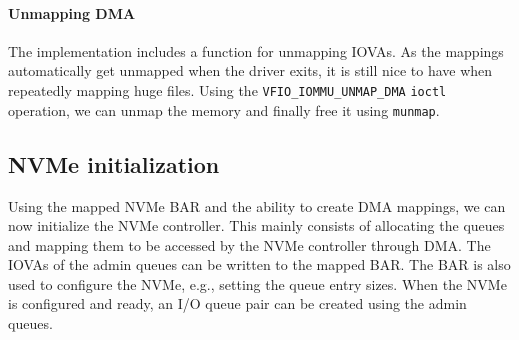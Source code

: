 \paragraph{Unmapping DMA}
The implementation includes a function for unmapping IOVAs. As the mappings automatically get unmapped when the driver exits, it is still nice to have when repeatedly mapping huge files. Using the \texttt{VFIO\_IOMMU\_UNMAP\_DMA} \texttt{ioctl} operation, we can unmap the memory and finally free it using \texttt{munmap}.

\subsection{NVMe initialization}\label{sec:nvmeinit}
Using the mapped NVMe BAR and the ability to create DMA mappings, we can now initialize the NVMe controller. This mainly consists of allocating the queues and mapping them to be accessed by the NVMe controller through DMA. The IOVAs of the admin queues can be written to the mapped BAR. The BAR is also used to configure the NVMe, e.g., setting the queue entry sizes. When the NVMe is configured and ready, an I/O queue pair can be created using the admin queues.

